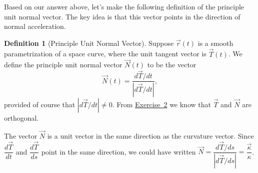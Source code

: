 \documentclass[10pt,]{book}
\theoremstyle{plain}
\theoremstyle{definition}
\newtheorem{definition}[theorem]{Definition}
\theoremstyle{definition}
\theoremstyle{definition}
\theoremstyle{definition}
\theoremstyle{definition}
\numberwithin{equation}{section}
\newcommand{\ds}{\displaystyle}
\begin{document}
Based on our answer above, let's make the following definition of the principle unit normal vector. The key idea is that this vector points in the direction of normal acceleration.%
\begin{definition}[{Principle Unit Normal Vector}]\label{definition-28}
Suppose \(\vec r(t)\) is a smooth parametrization of a space curve, where the unit tangent vector is \(\vec T(t)\). We define the principle unit normal vector \(\vec N(t)\) to be the vector%
\begin{equation*}
\vec N(t) = \ds\frac{d\vec T/dt}{|d\vec T/dt|},
\end{equation*}
provided of course that \(|d\vec T/dt|\neq 0\). From \hyperref[T_and_N_are_orthogonal]{Exercise~2} we know that \(\vec T\) and \(\vec N\) are orthogonal.%
\end{definition}
The vector \(\vec N\) is a unit vector in the same direction as the curvature vector. Since \(\dfrac{d\vec T}{dt}\) and \(\dfrac{d\vec T}{ds}\) point in the same direction, we could have written \(\vec N = \dfrac{d\vec T/ds}{|d\vec T/ds|} = \dfrac{\vec \kappa}{\kappa}\).%
\typeout{************************************************}
\typeout{************************************************}
\end{document}
